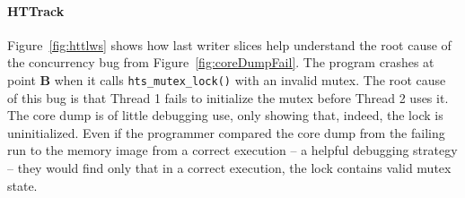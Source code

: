 \documentclass[preprint,9pt]{sigplanconf}
\begin{document}
\paragraph{HTTrack}
%
%
%

Figure~\ref{fig:httlws} shows how last writer slices help understand the root
cause of the concurrency bug from Figure~\ref{fig:coreDumpFail}.  The program
crashes at point {\bf B} when it calls {\tt hts\_mutex\_lock()} with an invalid
mutex.    The root cause of this bug is that Thread 1 fails to initialize the
mutex before Thread 2 uses it.   The core dump is of little debugging use, only
showing that, indeed, the lock is uninitialized.  Even if the programmer
compared the core dump from the failing run to the memory image from a correct
execution -- a helpful debugging strategy -- they would find only that in a
correct execution, the lock contains valid mutex state.
\end{document}
